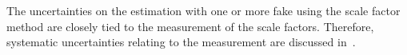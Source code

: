 The uncertainties on the \ttbar estimation with one or more fake
\tauhad using the scale factor method are closely tied to the
measurement of the scale factors. Therefore, systematic uncertainties
relating to the measurement are discussed
in~.
